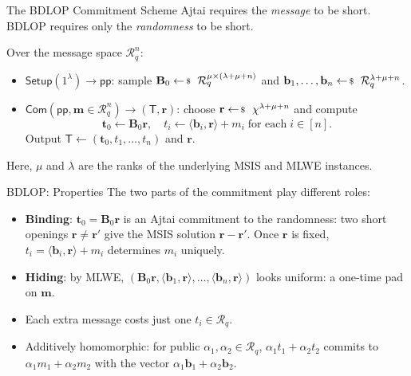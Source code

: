\documentclass{zkdl-presentation-template}
\begin{document}
    \begin{frame}{The BDLOP Commitment Scheme}
        Ajtai requires the \emph{message} to be short. BDLOP requires only the \emph{randomness} to be short.
        \begin{definition}
            Over the message space $\mathcal{R}_q^n$:
            \begin{itemize}
                \item $\mathsf{Setup}(1^{\lambda}) \to \mathsf{pp}$: sample $\mathbf{B}_0 \leftarrowS \mathcal{R}_q^{\mu \times (\lambda+\mu+n)}$ and $\mathbf{b}_1, \dots, \mathbf{b}_n \leftarrowS \mathcal{R}_q^{\lambda+\mu+n}$.
                \item $\mathsf{Com}(\mathsf{pp}, \mathbf{m} \in \mathcal{R}_q^n) \to (\mathsf{T}, \mathbf{r})$: choose $\mathbf{r} \leftarrowS \chi^{\lambda+\mu+n}$ and compute
                \begin{equation*}
                    \mathbf{t}_0 \gets \mathbf{B}_0\mathbf{r}, \quad t_i \gets \langle \mathbf{b}_i, \mathbf{r} \rangle + m_i \; \text{for each} \; i \in [n].
                \end{equation*}
                Output $\mathsf{T} \gets (\mathbf{t}_0, t_1, \dots, t_n)$ and $\mathbf{r}$.
            \end{itemize}
            Here, $\mu$ and $\lambda$ are the ranks of the underlying MSIS and MLWE instances.
        \end{definition}
    \end{frame}

    \begin{frame}{BDLOP: Properties}
        The two parts of the commitment play different roles:
        \begin{itemize}
            \item \textbf{Binding}: $\mathbf{t}_0 = \mathbf{B}_0\mathbf{r}$ is an Ajtai commitment to the randomness: two short openings $\mathbf{r} \neq \mathbf{r}'$ give the MSIS solution $\mathbf{r}-\mathbf{r}'$. Once $\mathbf{r}$ is fixed, $t_i = \langle \mathbf{b}_i, \mathbf{r} \rangle + m_i$ determines $m_i$ uniquely.\pause
            \item \textbf{Hiding}: by MLWE, $(\mathbf{B}_0\mathbf{r}, \langle \mathbf{b}_1,\mathbf{r}\rangle, \dots, \langle \mathbf{b}_n,\mathbf{r}\rangle)$ looks uniform: a one-time pad on $\mathbf{m}$.\pause
            \item Each extra message costs just one $t_i \in \mathcal{R}_q$.\pause
            \item Additively homomorphic: for public $\alpha_1, \alpha_2 \in \mathcal{R}_q$, $\alpha_1 t_1 + \alpha_2 t_2$ commits to $\alpha_1 m_1 + \alpha_2 m_2$ with the vector $\alpha_1\mathbf{b}_1 + \alpha_2\mathbf{b}_2$.
        \end{itemize}
    \end{frame}
\end{document}
